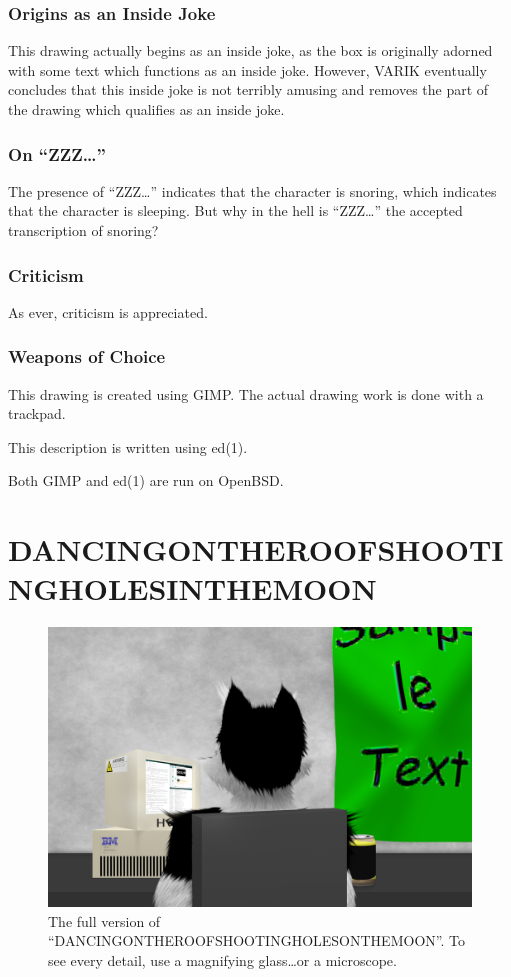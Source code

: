 \documentclass{report}
\begin{document}
\subsection{Origins as an Inside Joke}
This drawing actually begins as an inside joke, as the box is originally adorned with some text which functions as an inside joke.  However, VARIK eventually concludes that this inside joke is not terribly amusing and removes the part of the drawing which qualifies as an inside joke.

\subsection{On ``ZZZ\ldots''}
The presence of ``ZZZ\ldots'' indicates that the character is snoring, which indicates that the character is sleeping.  But why in the hell is ``ZZZ\ldots'' the accepted transcription of snoring?

\subsection{Criticism}
As ever, criticism is appreciated.

\subsection{Weapons of Choice}
This drawing is created using GIMP.  The actual drawing work is done with a trackpad.

This description is written using ed(1).

Both GIMP and ed(1) are run on OpenBSD.
\chapter{DANCINGONTHEROOFSHOOTINGHOLESINTHEMOON}
\begin{figure}[ht]
	\centering
	\includegraphics[width=\textwidth]{dancingontheroofshootingholesinthemoon/dancingontheroofshootingholesinthemoon.png}
\caption[center]{The full version of ``DANCINGONTHEROOFSHOOTINGHOLESONTHEMOON''.  To see every detail, use a magnifying glass\ldots or a microscope.}
\end{figure}
\end{document}
